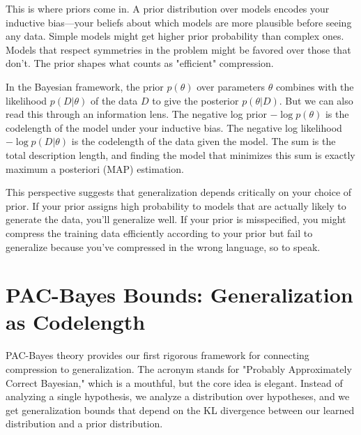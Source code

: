 \vspace{0.3cm}

This is where priors come in. A prior distribution over models encodes your inductive bias---your beliefs about which models are more plausible before seeing any data. Simple models might get higher prior probability than complex ones. Models that respect symmetries in the problem might be favored over those that don't. The prior shapes what counts as "efficient" compression.

\vspace{0.3cm}

In the Bayesian framework, the prior $p(\theta)$ over parameters $\theta$ combines with the likelihood $p(D|\theta)$ of the data $D$ to give the posterior $p(\theta|D)$. But we can also read this through an information lens. The negative log prior $-\log p(\theta)$ is the codelength of the model under your inductive bias. The negative log likelihood $-\log p(D|\theta)$ is the codelength of the data given the model. The sum is the total description length, and finding the model that minimizes this sum is exactly maximum a posteriori (MAP) estimation.

\vspace{0.3cm}

This perspective suggests that generalization depends critically on your choice of prior. If your prior assigns high probability to models that are actually likely to generate the data, you'll generalize well. If your prior is misspecified, you might compress the training data efficiently according to your prior but fail to generalize because you've compressed in the wrong language, so to speak.

\vspace{2em}

\section{PAC-Bayes Bounds: Generalization as Codelength}

PAC-Bayes theory provides our first rigorous framework for connecting compression to generalization. The acronym stands for "Probably Approximately Correct Bayesian," which is a mouthful, but the core idea is elegant. Instead of analyzing a single hypothesis, we analyze a distribution over hypotheses, and we get generalization bounds that depend on the KL divergence between our learned distribution and a prior distribution.

